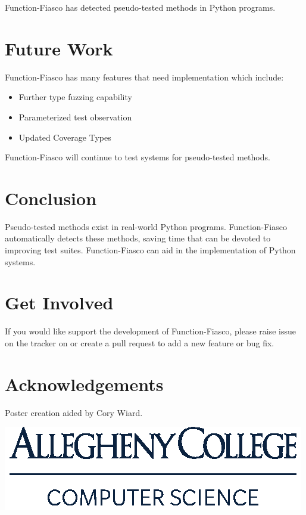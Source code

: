 \documentclass[a0paper,fleqn]{betterposter}
\begin{document}
{Function-Fiasco has detected pseudo-tested methods in Python programs.

\section{Future Work}
Function-Fiasco has many features that need implementation which include:\\
\begin{itemize}[leftmargin=*]
\item{Further type fuzzing capability}
\item{Parameterized test observation}
\item{Updated Coverage Types}
\end{itemize}
\vspace{1em}
Function-Fiasco will continue to test systems for pseudo-tested methods.

\section{Conclusion}
%
Pseudo-tested methods exist in real-world Python programs.
%
Function-Fiasco automatically detects these methods, saving time that can be
devoted to improving test suites.
%
Function-Fiasco can aid in the implementation of Python systems.

\section{Get Involved}
%
If you would like support the development of Function-Fiasco, please raise issue
on the tracker on or create a pull request to add a new feature or bug fix.
%
\vfill

\section{Acknowledgements}
%
Poster creation aided by Cory Wiard.\\

\vspace*{.5in}

\includegraphics[width=\textwidth]{img/ComputerScience-Stack}

}
\end{document}
